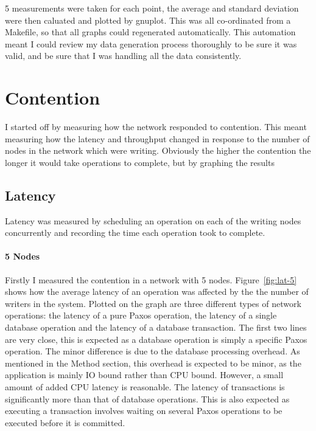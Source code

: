 \documentclass[12pt,twoside,notitlepage]{report}
\newcommand{\lwincludegraphics}[2][]{%
  \sbox{0}{\texttt{[image: \#2]}}%
  \ifdim\wd0>\linewidth
    \resizebox{\linewidth}{!}{\box0 }%
  \else
    \leavevmode\box0
  \fi}
\begin{document}
5 measurements were taken for each point, the average and standard deviation were then caluated
and plotted by gnuplot. This was all co-ordinated from a Makefile, so that all graphs could
regenerated automatically. This automation meant I could review my data generation process
thoroughly to be sure it was valid, and be sure that I was handling all the data consistently.

\section{Contention}

I started off by measuring how the network responded to contention. This meant measuring how
the latency and throughput changed in response to the number of nodes in the network
which were writing. Obviously the higher the contention the longer it would take operations to
complete, but by graphing the results 

\subsection{Latency}

Latency was measured by scheduling an operation on each of the writing nodes concurrently and
recording the time each operation took to complete.

\begin{figure}[Hp]
\centering
\end{figure}

\paragraph{5 Nodes}

Firstly I measured the contention in a network with 5 nodes. Figure~\ref{fig:lat-5} shows how the
average latency of an operation was affected by the the number of writers in the system. Plotted
on the graph are three different types of network operations: the latency of a pure Paxos
operation, the latency of a single database operation and the latency of a database transaction.
The first two lines are very close, this is expected as a database operation is simply a specific
Paxos operation. The minor difference is due to the database processing overhead. As mentioned in
the Method section, this overhead is expected to be minor, as the application is mainly IO bound
rather than CPU bound. However, a small amount of added CPU latency is reasonable.  The latency of
transactions is significantly more than that of database operations. This is also expected as
executing a transaction involves waiting on several Paxos operations to be executed before it is
committed.
\end{document}
